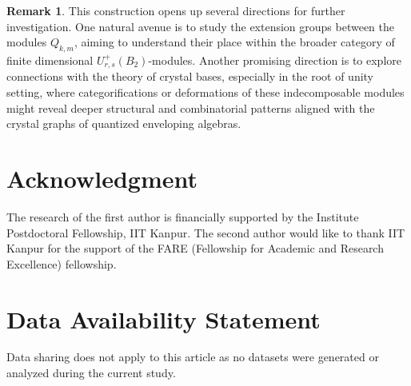 \documentclass[12 pt,reqno]{amsart}
\numberwithin{equation}{section}
\theoremstyle{definition}
\newtheorem{remark}[thm]{Remark}
\theoremstyle{definition}
\theoremstyle{remark}
\theoremstyle{remark}
\begin{document}
\begin{remark}
This construction opens up several directions for further investigation. One natural avenue is to study the extension groups between the modules $ Q_{k,m} $, aiming to understand their place within the broader category of finite dimensional $ U_{r,s}^+(B_2)$-modules. Another promising direction is to explore connections with the theory of crystal bases, especially in the root of unity setting, where categorifications or deformations of these indecomposable modules might reveal deeper structural and combinatorial patterns aligned with the crystal graphs of quantized enveloping algebras.

\end{remark}

\section*{Acknowledgment} The research of the first author is financially supported by the Institute Postdoctoral Fellowship, IIT Kanpur. The second author would like to thank IIT Kanpur for the support of the FARE (Fellowship for Academic and Research Excellence) fellowship.
\section*{Data Availability Statement}
Data sharing does not apply to this article as no datasets were generated or analyzed during the current study.
\end{document}
